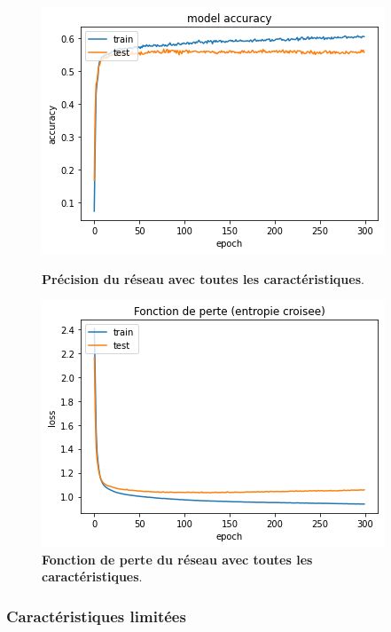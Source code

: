 \begin{figure}[ht]
	\centering
	\begin{minipage}[t]{0.48\textwidth}
		\centering
		\includegraphics[scale=0.475]{../images/vins_blancs/full_class_accuracy_white.png}
		\caption[Précision du réseau avec toutes les caractéristiques.]
		{\textbf{Précision du réseau avec toutes les caractéristiques}.}
		\label{fig:full-class-accuracy-white}
	\end{minipage}\hfill
	\begin{minipage}[t]{0.48\textwidth}
		\centering
		\includegraphics[scale=0.475]{../images/vins_blancs/full_class_loss_white.png}
		\caption[Fonction de perte du réseau avec toutes les caractéristiques.]
		{\textbf{Fonction de perte du réseau avec toutes les caractéristiques}.}
		\label{fig:full-class-loss-white}
	\end{minipage}
\end{figure}

\subsubsection*{Caractéristiques limitées}
\label{par:dataset-limitee-neurones}

